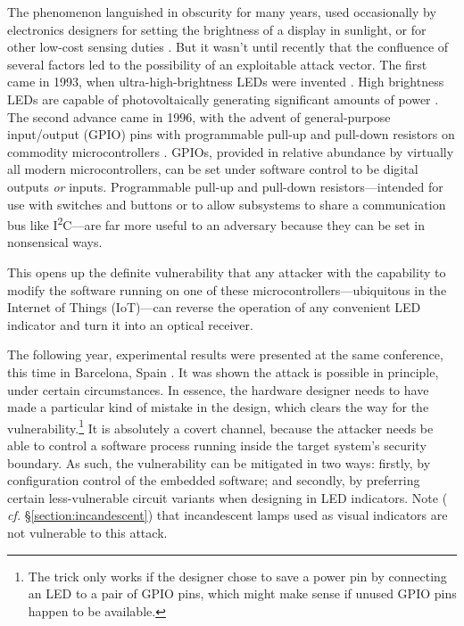 \documentclass[a4paper,twoside,11pt,openany]{book}
\begin{document}
The phenomenon languished in obscurity for many years, used
occasionally by electronics designers for setting the brightness of a display
in sunlight, or for other low-cost sensing duties
\cite{MERL2003a,Karadaglic2007a}. But it wasn't until recently that the
confluence of several factors led to the possibility of an exploitable attack
vector. The first came in 1993, when ultra-high-brightness LEDs were invented
\cite{Stringfellow1997}. High brightness LEDs are capable of photovoltaically
generating significant amounts of power \cite{Allain2019}. The second advance
came in 1996, with the advent of general-purpose input/output (GPIO) pins with
programmable pull-up and pull-down resistors on commodity microcontrollers
\cite{Atmel2013}. GPIOs, provided in relative abundance by virtually all modern
microcontrollers, can be set under software control to be digital outputs
\emph{or} inputs. Programmable pull-up and pull-down resistors---intended for
use with switches and buttons or to allow subsystems to share a communication
bus like I\textsuperscript{2}C---are far more useful to an adversary because
they can be set in nonsensical ways.

This opens up the definite vulnerability that any attacker
with the capability to modify the software running on one of these
microcontrollers---ubiquitous in the Internet of Things (IoT)---can reverse the
operation of any convenient LED indicator and turn it into an optical receiver.

The following year, experimental results were presented at the same conference,
this time in Barcelona, Spain \cite{Loughry2019}. It was shown the attack is
possible in principle, under certain circumstances. In essence, the hardware
designer needs to have made a particular kind of mistake in the design, which
clears the way for the vulnerability.\footnote{The trick only works if the
designer chose to save a power pin by connecting an LED to a pair of GPIO pins,
which might make sense if unused GPIO pins happen to be available.} It is
absolutely a covert channel, because the attacker needs be able to control a
software process running inside the target system's security boundary. As such,
the vulnerability can be mitigated in two ways: firstly, by configuration
control of the embedded software; and secondly, by preferring certain
less-vulnerable circuit variants when designing in LED indicators. Note ({\it
cf.} \S\ref{section:incandescent}) that incandescent lamps used as visual
indicators are not vulnerable to this attack.

\end{document}
